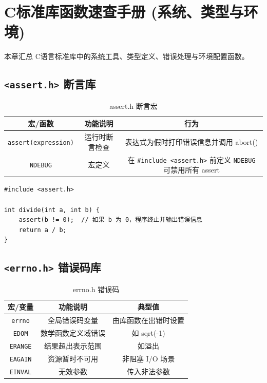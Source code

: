 \clearpage
\begingroup
\let\clearpage\relax
\let\cleardoublepage\relax
\vspace*{\fill}
\chapter{C标准库函数速查手册 (系统、类型与环境)}
\begin{center}
本章汇总 C语言标准库中的系统工具、类型定义、错误处理与环境配置函数。
\end{center}
\vspace*{\fill}
\endgroup
\clearpage


\section{\texorpdfstring{\texttt{<assert.h>} 断言库}{<assert.h> 断言库}}

\begin{table}[H]
\centering
\renewcommand{\arraystretch}{1.6}
\begin{tabulary}{\linewidth}{CCC}
\toprule
\textbf{宏/函数} & \textbf{功能说明} & \textbf{行为} \\ \midrule
\texttt{assert(expression)} & 运行时断言检查 & 表达式为假时打印错误信息并调用 abort() \\ 
\texttt{NDEBUG} & 宏定义 & 在 \texttt{\#include <assert.h>} 前定义 \texttt{NDEBUG} 可禁用所有 assert \\ \bottomrule
\end{tabulary}
\caption{assert.h 断言宏}
\label{tab:assert_funcs}
\end{table}

\begin{lstlisting}[caption={assert 使用示例}]
#include <assert.h>

int divide(int a, int b) {
    assert(b != 0);  // 如果 b 为 0，程序终止并输出错误信息
    return a / b;
}
\end{lstlisting}

\section{\texorpdfstring{\texttt{<errno.h>} 错误码库}{<errno.h> 错误码库}}

\begin{table}[H]
\centering
\renewcommand{\arraystretch}{1.6}
\begin{tabulary}{\linewidth}{CCC}
\toprule
\textbf{宏/变量} & \textbf{功能说明} & \textbf{典型值} \\ \midrule
\texttt{errno} & 全局错误码变量 & 由库函数在出错时设置 \\ 
\texttt{EDOM} & 数学函数定义域错误 & 如 sqrt(-1) \\ 
\texttt{ERANGE} & 结果超出表示范围 & 如溢出 \\ 
\texttt{EAGAIN} & 资源暂时不可用 & 非阻塞 I/O 场景 \\ 
\texttt{EINVAL} & 无效参数 & 传入非法参数 \\ \bottomrule
\end{tabulary}
\caption{errno.h 错误码}
\label{tab:errno_funcs}
\end{table}

